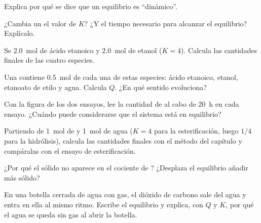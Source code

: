 \begin{exercise}[$\star$]\label{exo:g12:equilibrium:4}
Explica por qué se dice que un equilibrio es ``dinámico''.
\end{exercise}

\begin{exercise}[$\star$]\label{exo:g12:equilibrium:5}
¿Cambia un  el valor de $K$? ¿Y el tiempo necesario para
alcanzar el equilibrio? Explícalo.
\end{exercise}

\begin{exercise}[$\star\star$]\label{exo:g12:equilibrium:6}
Se  \qty{2.0}{mol} de ácido etanoico y \qty{2.0}{mol} de etanol
($K = 4$). Calcula las cantidades finales de las cuatro especies.
\end{exercise}

\begin{exercise}[$\star\star$]\label{exo:g12:equilibrium:7}
Una  contiene \qty{0.5}{mol} de cada una de estas especies: ácido
etanoico, etanol, etanoato de etilo y agua. Calcula $Q$. ¿En qué sentido
evoluciona?
\end{exercise}

\begin{exercise}[$\star\star$]\label{exo:g12:equilibrium:8}
Con la figura de los dos ensayos, lee la cantidad de  al cabo de
\qty{20}{h} en cada ensayo. ¿Cuándo puede considerarse que el sistema
está en equilibrio?
\end{exercise}

\begin{exercise}[$\star\star$]\label{exo:g12:equilibrium:9}
Partiendo de \qty{1}{mol} de  y \qty{1}{mol} de agua ($K = 4$ para
la esterificación, luego $1/4$ para la hidrólisis), calcula las
cantidades finales con el método del capítulo y compáralas con el ensayo
de esterificación.
\end{exercise}

\begin{exercise}[$\star\star$]\label{exo:g12:equilibrium:10}
¿Por qué el sólido no aparece en el cociente de
? ¿Desplaza el equilibrio añadir más sólido?
\end{exercise}

\begin{exercise}[$\star\star$]\label{exo:g12:equilibrium:11}
En una botella cerrada de agua con gas, el dióxido de carbono sale del
agua y entra en ella al mismo ritmo. Escribe el equilibrio
 y explica, con $Q$ y $K$, por qué el agua se
queda sin gas al abrir la botella.
\end{exercise}

